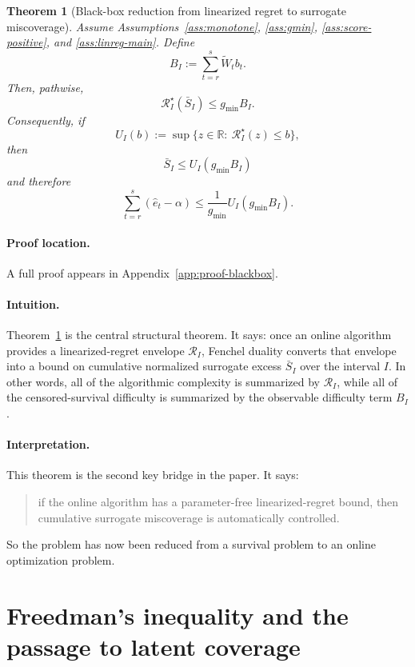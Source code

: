 \documentclass[11pt]{article}
\newtheorem{theorem}{Theorem}
\newcommand{\R}{\mathbb{R}}
\newcommand{\1}{\mathbf{1}}
\begin{document}
\begin{theorem}[Black-box reduction from linearized regret to surrogate miscoverage]
\label{thm:blackbox}
Assume Assumptions~\ref{ass:monotone}, \ref{ass:gmin}, \ref{ass:score-positive}, and \ref{ass:linreg-main}. Define
\[
B_I:=\sum_{t=r}^s \widetilde W_t b_t.
\]
Then, pathwise,
\[
\mathcal R_I^\star(\bar S_I)\le g_{\min}B_I.
\]
Consequently, if
\[
U_I(b):=\sup\{z\in\R:\ \mathcal R_I^\star(z)\le b\},
\]
then
\[
\bar S_I\le U_I(g_{\min}B_I)
\]
and therefore
\[
\sum_{t=r}^s(\hat e_t-\alpha)
\le
\frac{1}{g_{\min}}U_I(g_{\min}B_I).
\]
\end{theorem}

\paragraph{Proof location.} A full proof appears in Appendix~\ref{app:proof-blackbox}.


\paragraph{Intuition.} Theorem~\ref{thm:blackbox} is the central structural theorem. It says: once an online algorithm provides a linearized-regret envelope $\mathcal R_I$, Fenchel duality converts that envelope into a bound on cumulative normalized surrogate excess $\bar S_I$ over the interval $I$. In other words, all of the algorithmic complexity is summarized by $\mathcal R_I$, while all of the censored-survival difficulty is summarized by the observable difficulty term $B_I$.


\paragraph{Interpretation.}
This theorem is the second key bridge in the paper. It says:
\begin{quote}
if the online algorithm has a parameter-free linearized-regret bound, then cumulative surrogate miscoverage is automatically controlled.
\end{quote}

So the problem has now been reduced from a survival problem to an online optimization problem.

\section{Freedman's inequality and the passage to latent coverage}
\label{sec:freedman}
\end{document}

